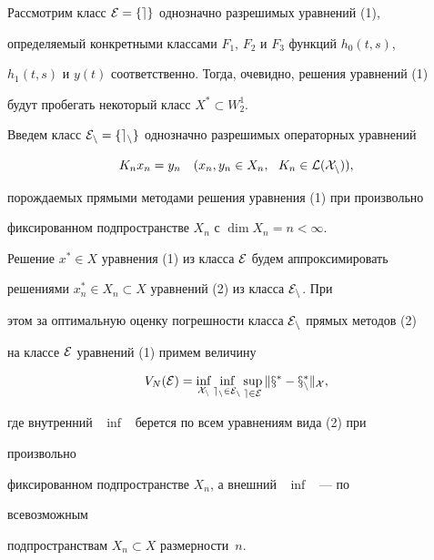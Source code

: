  


Рассмотрим класс $\cal E=\{e\}$ однозначно разрешимых уравнений (1), 


определяемый конкретными классами $F_1$, $F_2$ и $F_3$ функций $h_0(t,s)$, 


$h_1(t,s)$ и $y(t)$ соответственно. Тогда, очевидно, решения уравнений (1) 


будут пробегать некоторый класс $X^*\subset W^1_2$. 


Введем класс $\cal E_n=\{e_n\}$ однозначно разрешимых операторных уравнений 


\begin{equation} 


K_n x_n=y_n\quad (x_n,y_n\in X_n,\ \ K_n\in\cal L(X_n)), 


\end{equation} 


порождаемых прямыми методами решения уравнения (1) при произвольно 


фиксированном подпространстве $X_n$ с $\dim X_n=n<\infty$. 


 


Решение $x^*\in X$ уравнения (1) из класса $\cal E$ будем аппроксимировать 


решениями $x^*_n\in X_n\subset X$ уравнений (2) из класса $\cal E_n$. При 


этом за оптимальную оценку погрешности класса $\cal E_n$ прямых методов (2) 


на классе $\cal E$ уравнений (1) примем величину 


\begin{equation} 


V_N(\cal E)=\inf_{X_n}\inf_{e_n\in\cal E_n}\sup_{e\in\cal E} 


\|x^*-x^*_n\|_X, 


\end{equation} 


где внутренний \ $\inf$ \ берется по всем уравнениям вида (2) при 


произвольно 


фиксированном подпространстве $X_n$, а внешний \ $\inf$ \ --- по 


всевозможным 


подпространствам $X_n\subset X$ размерности~$n$. 


 


 


